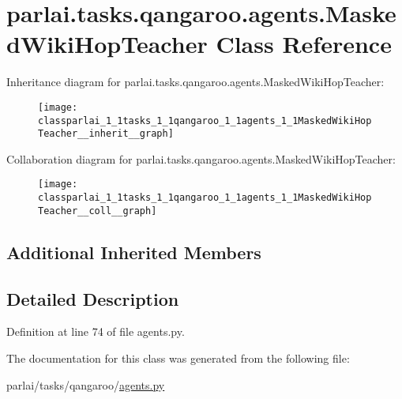 \hypertarget{classparlai_1_1tasks_1_1qangaroo_1_1agents_1_1MaskedWikiHopTeacher}{}\section{parlai.\+tasks.\+qangaroo.\+agents.\+Masked\+Wiki\+Hop\+Teacher Class Reference}
\label{classparlai_1_1tasks_1_1qangaroo_1_1agents_1_1MaskedWikiHopTeacher}


Inheritance diagram for parlai.\+tasks.\+qangaroo.\+agents.\+Masked\+Wiki\+Hop\+Teacher\+:
\nopagebreak
\begin{figure}[H]
\begin{center}
\leavevmode
\texttt{[image: classparlai\_1\_1tasks\_1\_1qangaroo\_1\_1agents\_1\_1MaskedWikiHopTeacher\_\_inherit\_\_graph]}
\end{center}
\end{figure}


Collaboration diagram for parlai.\+tasks.\+qangaroo.\+agents.\+Masked\+Wiki\+Hop\+Teacher\+:
\nopagebreak
\begin{figure}[H]
\begin{center}
\leavevmode
\texttt{[image: classparlai\_1\_1tasks\_1\_1qangaroo\_1\_1agents\_1\_1MaskedWikiHopTeacher\_\_coll\_\_graph]}
\end{center}
\end{figure}
\subsection*{Additional Inherited Members}


\subsection{Detailed Description}


Definition at line 74 of file agents.\+py.



The documentation for this class was generated from the following file\+:\begin{DoxyCompactItemize}
\item 
parlai/tasks/qangaroo/\hyperlink{parlai_2tasks_2qangaroo_2agents_8py}{agents.\+py}\end{DoxyCompactItemize}

